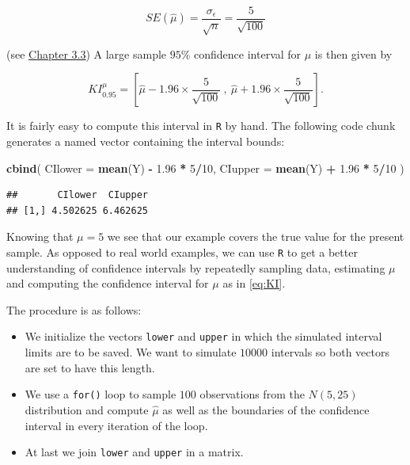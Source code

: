 \documentclass[]{book}
\newenvironment{Shaded}{\begin{snugshade}}{\end{snugshade}}
\newcommand{\KeywordTok}[1]{\textcolor[rgb]{0.13,0.29,0.53}{\textbf{#1}}}
\newcommand{\DataTypeTok}[1]{\textcolor[rgb]{0.13,0.29,0.53}{#1}}
\newcommand{\DecValTok}[1]{\textcolor[rgb]{0.00,0.00,0.81}{#1}}
\newcommand{\FloatTok}[1]{\textcolor[rgb]{0.00,0.00,0.81}{#1}}
\newcommand{\StringTok}[1]{\textcolor[rgb]{0.31,0.60,0.02}{#1}}
\newcommand{\OperatorTok}[1]{\textcolor[rgb]{0.81,0.36,0.00}{\textbf{#1}}}
\newcommand{\NormalTok}[1]{#1}
\providecommand{\tightlist}{%
  \setlength{\itemsep}{0pt}\setlength{\parskip}{0pt}}
\theoremstyle{definition}
\theoremstyle{definition}
\theoremstyle{definition}
\theoremstyle{remark}
\begin{document}
\[ SE(\hat\mu) = \frac{\sigma_{\epsilon}}{\sqrt{n}} = \frac{5}{\sqrt{100}} \]

(see \protect\hyperlink{SVSSDASE}{Chapter 3.3}) A large sample \(95\%\)
confidence interval for \(\mu\) is then given by

\begin{equation} 
KI^{\mu}_{0.95} = \left[\hat\mu - 1.96 \times \frac{5}{\sqrt{100}} \ , \ \hat\mu + 1.96 \times \frac{5}{\sqrt{100}}  \right]. \label{eq:KI}
\end{equation}

It is fairly easy to compute this interval in \texttt{R} by hand. The
following code chunk generates a named vector containing the interval
bounds:

\begin{Shaded}
\begin{Highlighting}[]
\KeywordTok{cbind}\NormalTok{(}
  \DataTypeTok{CIlower =} \KeywordTok{mean}\NormalTok{(Y) }\OperatorTok{-}\StringTok{ }\FloatTok{1.96} \OperatorTok{*}\StringTok{ }\DecValTok{5}\OperatorTok{/}\DecValTok{10}\NormalTok{, }
  \DataTypeTok{CIupper =} \KeywordTok{mean}\NormalTok{(Y) }\OperatorTok{+}\StringTok{ }\FloatTok{1.96} \OperatorTok{*}\StringTok{ }\DecValTok{5}\OperatorTok{/}\DecValTok{10} 
\NormalTok{)}
\end{Highlighting}
\end{Shaded}

\begin{verbatim}
##       CIlower  CIupper
## [1,] 4.502625 6.462625
\end{verbatim}

Knowing that \(\mu = 5\) we see that our example covers the true value
for the present sample. As opposed to real world examples, we can use
\texttt{R} to get a better understanding of confidence intervals by
repeatedly sampling data, estimating \(\mu\) and computing the
confidence interval for \(\mu\) as in \eqref{eq:KI}.

The procedure is as follows:

\begin{itemize}
\tightlist
\item
  We initialize the vectors \texttt{lower} and \texttt{upper} in which
  the simulated interval limits are to be saved. We want to simulate
  \(10000\) intervals so both vectors are set to have this length.
\item
  We use a \texttt{for()} loop to sample \(100\) observations from the
  \(N(5,25)\) distribution and compute \(\hat\mu\) as well as the
  boundaries of the confidence interval in every iteration of the loop.
\item
  At last we join \texttt{lower} and \texttt{upper} in a matrix.
\end{itemize}
\end{document}
